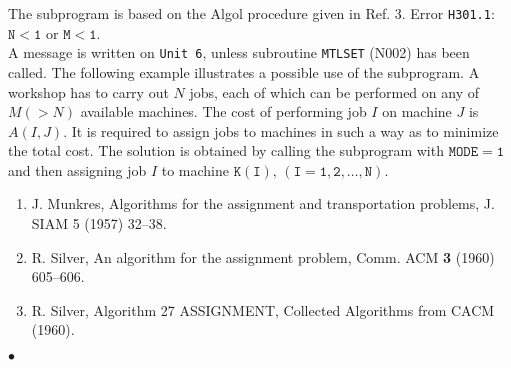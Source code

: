 \Method
The subprogram is based on the Algol procedure given in Ref. 3.
\newpage
\Errorh
Error {\tt H301.1}: $\mathtt{N<1}$ or $\mathtt{M<1}$. \\
A message is written on {\tt Unit 6}, unless subroutine {\tt MTLSET}
(N002) has been called.
\Examples
The following example illustrates a possible use of the subprogram.
A workshop has to carry out $N$ jobs, each of
which can be performed on any of $M (>N)$ available machines.
The cost of performing job $I$ on machine $J$ is $A(I,J)$.
It is required to assign jobs to machines in such a way
as to minimize the total cost.
The solution is obtained by calling the subprogram
with $\mathtt{MODE=1}$ and then assigning job $I$ to machine
$\mathtt{K(I),\,(I=1,2,\ldots,N)}$.
\Refer
\begin{enumerate}
\item J. Munkres, Algorithms for the assignment and
transportation problems, J. SIAM 5 (1957) 32--38.
\item R. Silver, An algorithm for the assignment problem,
Comm. ACM {\bf 3} (1960) 605--606.
\item R. Silver, Algorithm 27 ASSIGNMENT, Collected Algorithms from CACM
(1960).
\end{enumerate}
$\bullet$
